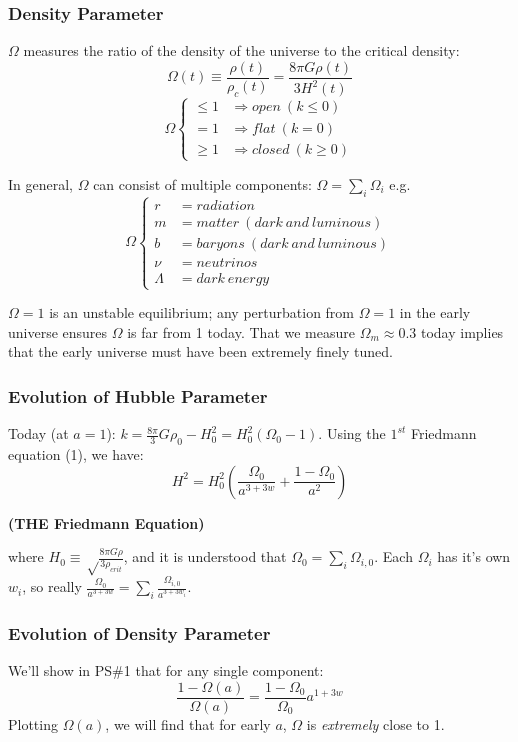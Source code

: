 \documentclass{article}
\def\imply{\Rightarrow}
\def\etot{\Omega_0}
\def\epot{\frac{8\pi}{ 3}}
\def\attw{a^{3+3w}}
\def\imply{\Rightarrow}
\def\etot{\Omega_0}
\def\attw{a^{3+3w}}
\def\rcr{{\rho_{crit}}}
\begin{document}
\subsubsection{ Density Parameter}

$\Omega$ measures the ratio of the density of the universe to the critical
density:
$$\Omega(t)\equiv\frac{\rho(t)}{\rho_c(t)}=\frac{8\pi G\rho(t)}{ 3H^2(t)}$$
$$\Omega\begin{cases}
\le1&\imply open\ (k\le0)\\
=1&\imply flat\ (k=0)\\
\ge1&\imply closed\ (k\ge0)
\end{cases}$$

In general, $\Omega$ can consist of multiple components: 
$\Omega=\sum_i{\Omega_i}$ e.g. 
$$\Omega\begin{cases}
r&=radiation\\ 
m&=matter\ (dark\ and\ luminous)\\
b&=baryons\ (dark\ and\ luminous)\\ 
\nu &=neutrinos\\ 
\Lambda&=dark\ energy\end{cases}$$

$\Omega = 1$ is an unstable equilibrium; any perturbation from $\Omega=1$ in
the early universe ensures $\Omega$ is far from 1 today.  That we measure
$\Omega_m\approx0.3$ today implies that the early universe must have been
extremely finely tuned.

\subsubsection{ Evolution of Hubble Parameter}

Today (at $a=1$): $k=\epot G\rho_0-H_0^2=H_0^2(\Omega_0-1)$.  Using the
$1^{st}$ Friedmann equation (1), we have:
$$\boxed{H^2=H_0^2(\frac{\Omega_0}{ a^{3+3w}}+\frac{1-\Omega_0}{ a^2})}$$
\centerline{\bf (THE Friedmann Equation)}
where $H_0\equiv\sqrt\frac{8\pi G\rho}{3\rcr}$, and it is understood that
$\etot=\sum_i{\Omega_{i,0}}$.  Each $\Omega_i$ has it's own $w_i$, so really
$\frac{\Omega_0}{\attw}=\sum_i\frac{\Omega_{i,0}}{ a^{3+3w_i}}$.

\subsubsection{ Evolution of Density Parameter}

We'll show in PS\#1 that for any single component:
$$\frac{1-\Omega(a)}{\Omega(a)}=\frac{1-\Omega_0}{\Omega_0}a^{1+3w}$$
Plotting $\Omega(a)$, we will find that for early $a$, $\Omega$ is {\it 
extremely} close to 1.
\end{document}
